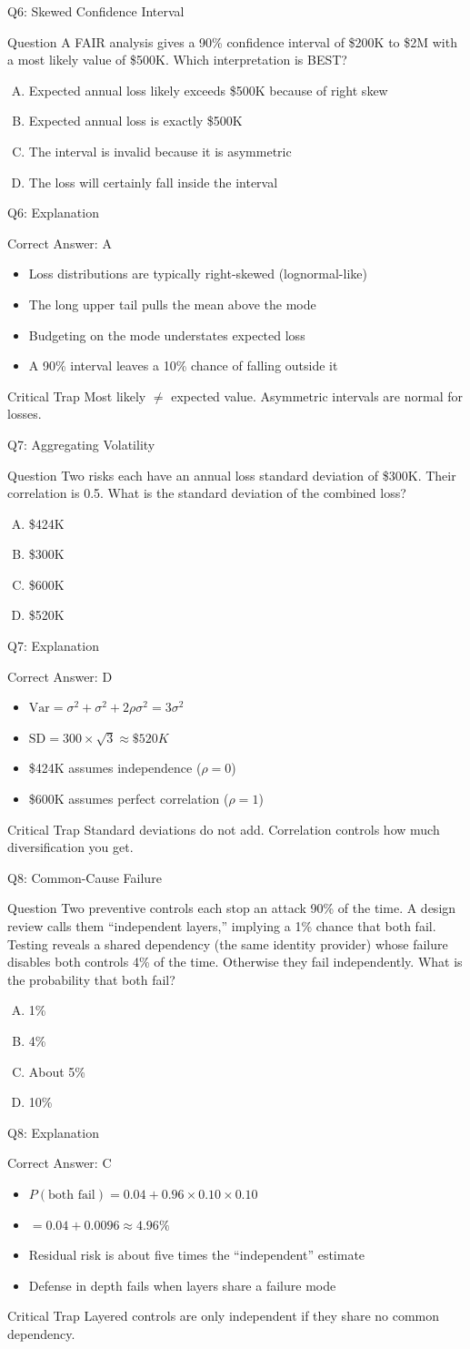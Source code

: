 \documentclass[aspectratio=169]{beamer}
\newcommand{\hq}[7]{%
	\begin{frame}{Q#1: #2}
		\begin{block}{Question}
			#3
		\end{block}
		\begin{enumerate}[(A)]
			#4
		\end{enumerate}
	\end{frame}
	\begin{frame}{Q#1: Explanation}
		\begin{block}{Correct Answer: #5}
			\begin{itemize}
				#6
			\end{itemize}
		\end{block}
		\begin{alertblock}{Critical Trap}
			#7
		\end{alertblock}
	\end{frame}
}
\begin{document}
	\hq{6}{Skewed Confidence Interval}
	{A FAIR analysis gives a 90\% confidence interval of \$200K to \$2M with a most likely value of \$500K. Which interpretation is BEST?}
	{\item Expected annual loss likely exceeds \$500K because of right skew
		\item Expected annual loss is exactly \$500K
		\item The interval is invalid because it is asymmetric
		\item The loss will certainly fall inside the interval}
	{A}
	{\item Loss distributions are typically right-skewed (lognormal-like)
		\item The long upper tail pulls the mean above the mode
		\item Budgeting on the mode understates expected loss
		\item A 90\% interval leaves a 10\% chance of falling outside it}
	{Most likely $\neq$ expected value. Asymmetric intervals are normal for losses.}
	
	\hq{7}{Aggregating Volatility}
	{Two risks each have an annual loss standard deviation of \$300K. Their correlation is 0.5. What is the standard deviation of the combined loss?}
	{\item \$424K
		\item \$300K
		\item \$600K
		\item \$520K}
	{D}
	{\item $\text{Var} = \sigma^2 + \sigma^2 + 2\rho\sigma^2 = 3\sigma^2$
		\item $\text{SD} = 300 \times \sqrt{3} \approx \$520K$
		\item \$424K assumes independence ($\rho = 0$)
		\item \$600K assumes perfect correlation ($\rho = 1$)}
	{Standard deviations do not add. Correlation controls how much diversification you get.}
	
	\hq{8}{Common-Cause Failure}
	{Two preventive controls each stop an attack 90\% of the time. A design review calls them ``independent layers,'' implying a 1\% chance that both fail. Testing reveals a shared dependency (the same identity provider) whose failure disables both controls 4\% of the time. Otherwise they fail independently. What is the probability that both fail?}
	{\item 1\%
		\item 4\%
		\item About 5\%
		\item 10\%}
	{C}
	{\item $P(\text{both fail}) = 0.04 + 0.96 \times 0.10 \times 0.10$
		\item $= 0.04 + 0.0096 \approx 4.96\%$
		\item Residual risk is about five times the ``independent'' estimate
		\item Defense in depth fails when layers share a failure mode}
	{Layered controls are only independent if they share no common dependency.}
	
\end{document}

